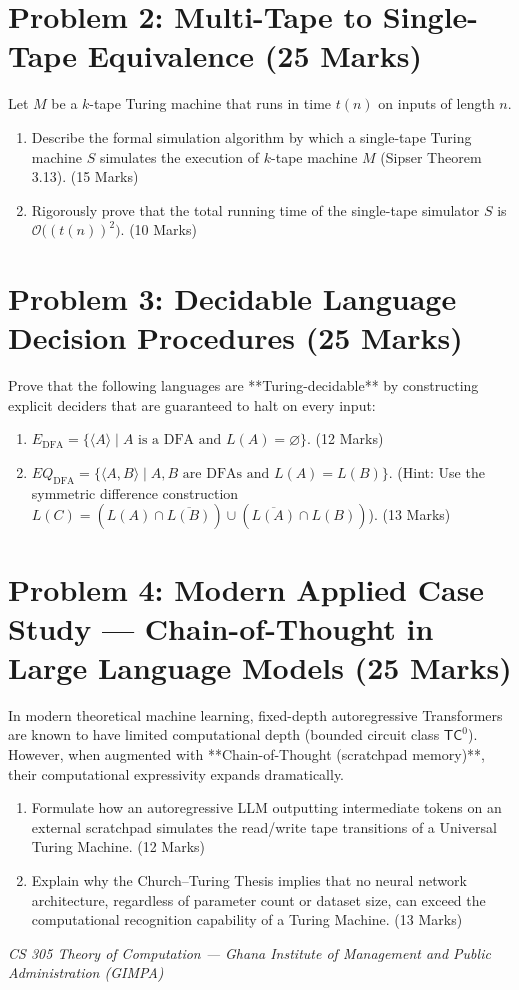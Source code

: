 \documentclass[11pt,a4paper]{article}
\begin{document}
\vspace{8pt}

\section*{Problem 2: Multi-Tape to Single-Tape Equivalence (25 Marks)}
Let $M$ be a $k$-tape Turing machine that runs in time $t(n)$ on inputs of length $n$.
\begin{enumerate}[label=\textbf{(\alph*)}]
    \item Describe the formal simulation algorithm by which a single-tape Turing machine $S$ simulates the execution of $k$-tape machine $M$ (Sipser Theorem 3.13). (15 Marks)
    \item Rigorously prove that the total running time of the single-tape simulator $S$ is $\mathcal{O}\big((t(n))^2\big)$. (10 Marks)
\end{enumerate}

\vspace{8pt}

\section*{Problem 3: Decidable Language Decision Procedures (25 Marks)}
Prove that the following languages are **Turing-decidable** by constructing explicit deciders that are guaranteed to halt on every input:
\begin{enumerate}[label=\textbf{(\alph*)}]
    \item $E_{\text{DFA}} = \{\langle A \rangle \mid A \text{ is a DFA and } L(A) = \varnothing\}$. (12 Marks)
    \item $EQ_{\text{DFA}} = \{\langle A, B \rangle \mid A, B \text{ are DFAs and } L(A) = L(B)\}$. (Hint: Use the symmetric difference construction $L(C) = (L(A) \cap \overline{L(B)}) \cup (\overline{L(A)} \cap L(B))$). (13 Marks)
\end{enumerate}

\vspace{8pt}

\section*{Problem 4: Modern Applied Case Study --- Chain-of-Thought in Large Language Models (25 Marks)}
In modern theoretical machine learning, fixed-depth autoregressive Transformers are known to have limited computational depth (bounded circuit class $\textsf{TC}^0$). However, when augmented with **Chain-of-Thought (scratchpad memory)**, their computational expressivity expands dramatically.
\begin{enumerate}[label=\textbf{(\alph*)}]
    \item Formulate how an autoregressive LLM outputting intermediate tokens on an external scratchpad simulates the read/write tape transitions of a Universal Turing Machine. (12 Marks)
    \item Explain why the Church--Turing Thesis implies that no neural network architecture, regardless of parameter count or dataset size, can exceed the computational recognition capability of a Turing Machine. (13 Marks)
\end{enumerate}

\vfill
\begin{center}
    \small\color{darkgray}
    \textit{CS 305 Theory of Computation --- Ghana Institute of Management and Public Administration (GIMPA)}
\end{center}
\end{document}
